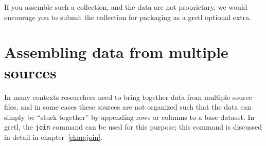 If you assemble such a collection, and the data are not proprietary, we
would encourage you to submit the collection for packaging as a
gretl optional extra.

\section{Assembling data from multiple sources}

In many contexts researchers need to bring together data from multiple
source files, and in some cases these sources are not organized such
that the data can simply be ``stuck together'' by appending rows or
columns to a base dataset. In gretl, the \texttt{join} command
can be used for this purpose; this command is discussed in detail in
chapter~\ref{chap:join}.



